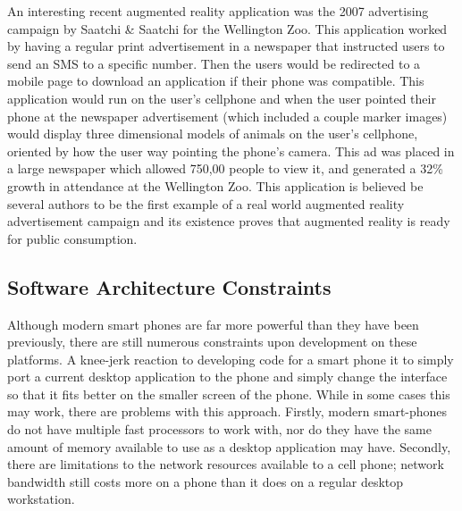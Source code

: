 \documentclass{acm_proc_article-sp}
\begin{document}
An interesting recent augmented reality application was the 2007 advertising campaign by Saatchi \& Saatchi
for the Wellington Zoo.  This application worked by having a regular print advertisement in a newspaper that instructed users to send an SMS to a specific number.  Then the users would be redirected to a mobile page to download an application if their phone was compatible.  This application would run on the user's cellphone and when the user pointed their phone at the newspaper advertisement (which included a couple marker images) would display three dimensional models of animals on the user's cellphone, oriented by how the user way pointing the phone's camera.  \cite{henrysson2007bringing} This ad was placed in a large newspaper which allowed 750,00 people to view it, and generated a 32\% growth in attendance at the Wellington Zoo. \cite{ar.wellington.zoo}  This application is believed be several authors to be the first example of a real world augmented reality advertisement campaign and its existence proves that augmented reality is ready for public consumption. \cite{henrysson2007bringing} \cite{wang2010authoring}

\subsection{Software Architecture Constraints}
Although modern smart phones are far more powerful than they have been previously, there are still numerous constraints upon development on these platforms.  A knee-jerk reaction to developing code for a smart phone it to simply port a current desktop application to the phone and simply change the interface so that it fits better on the smaller screen of the phone.  While in some cases this may work, there are problems with this approach.  Firstly, modern smart-phones do not have multiple fast processors to work with, nor do they have the same amount of memory available to use as a desktop application may have.  Secondly, there are limitations to the network resources available to a cell phone; network bandwidth still costs more on a phone than it does on a regular desktop workstation.  \cite{wagner2009making}  
\end{document}
